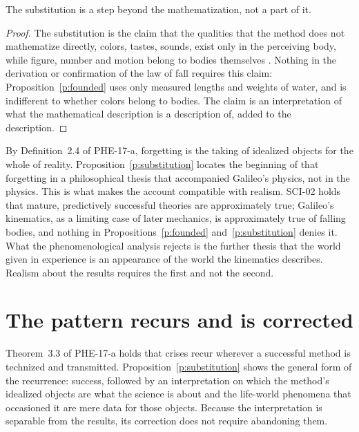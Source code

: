 \documentclass{situationist-preprint}
\begin{document}
\begin{proposition}\label{p:substitution}
The substitution is a step beyond the mathematization, not a part of it.
\end{proposition}

\begin{proof}
The substitution is the claim that the qualities that the method does not mathematize directly, colors, tastes, sounds, exist only in the perceiving body, while figure, number and motion belong to bodies themselves \citep{Galileo1623}. Nothing in the derivation or confirmation of the law of fall requires this claim: Proposition~\ref{p:founded} uses only measured lengths and weights of water, and is indifferent to whether colors belong to bodies. The claim is an interpretation of what the mathematical description is a description of, added to the description.
\end{proof}

By Definition~2.4 of PHE-17-a, forgetting is the taking of idealized objects for the whole of reality. Proposition~\ref{p:substitution} locates the beginning of that forgetting in a philosophical thesis that accompanied Galileo's physics, not in the physics. This is what makes the account compatible with realism. SCI-02 holds that mature, predictively successful theories are approximately true; Galileo's kinematics, as a limiting case of later mechanics, is approximately true of falling bodies, and nothing in Propositions~\ref{p:founded} and~\ref{p:substitution} denies it. What the phenomenological analysis rejects is the further thesis that the world given in experience is an appearance of the world the kinematics describes. Realism about the results requires the first and not the second.

\section{The pattern recurs and is corrected}

Theorem~3.3 of PHE-17-a holds that crises recur wherever a successful method is technized and transmitted. Proposition~\ref{p:substitution} shows the general form of the recurrence: success, followed by an interpretation on which the method's idealized objects are what the science is about and the life-world phenomena that occasioned it are mere data for those objects. Because the interpretation is separable from the results, its correction does not require abandoning them.
\end{document}
